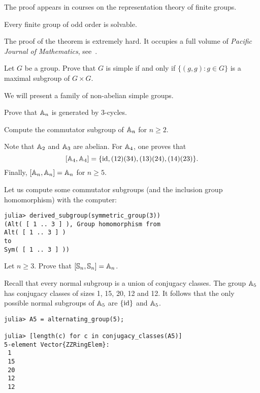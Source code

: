 The proof appears in courses on the 
representation theory of finite groups. 

\begin{theorem}
    Every finite group of odd order is solvable.
\end{theorem}

The proof of the theorem is extremely hard. It occupies a full volume of
\emph{Pacific Journal of Mathematics}, see~\cite{MR166261}.



\begin{exercise}
\label{xca:diagonal}
    Let $G$ be a group. 
    Prove that $G$ is simple if and only if 
    $\{(g,g):g\in G\}$ 
    is a maximal subgroup of $G\times G$. 
\end{exercise}


We will present a family of non-abelian simple groups. 

\begin{exercise}
    Prove that $\mathbb{A}_n$ is generated by 3-cycles. 
\end{exercise}

\begin{exercise}
    Compute the commutator subgroup of $\mathbb{A}_n$ for
    $n\geq2$. 
\end{exercise}

Note that $\mathbb{A}_2$ and $\mathbb{A}_3$ are abelian. 
For $\mathbb{A}_4$, one proves that 
\[
[\mathbb{A}_4,\mathbb{A}_4]=\{\operatorname{id},(12)(34),(13)(24),(14)(23)\}.
\]
Finally, $[\mathbb{A}_n,\mathbb{A}_n]=\mathbb{A}_n$ for $n\geq5$. 

Let us compute some commutator subgroups (and the inclusion group homomorphism)  
with the computer:
\begin{lstlisting}
julia> derived_subgroup(symmetric_group(3))
(Alt( [ 1 .. 3 ] ), Group homomorphism from 
Alt( [ 1 .. 3 ] )
to
Sym( [ 1 .. 3 ] ))    
\end{lstlisting}

\begin{exercise}
    Let $n\geq3$. 
    Prove that $[\mathbb{S}_n,\mathbb{S}_n]=\mathbb{A}_n$. 
\end{exercise}

Recall that every normal subgroup is a union of conjugacy classes. The group 
$\mathbb{A}_5$ has conjugacy classes of sizes 1, 15, 20, 12 and 12. It follows that 
the only possible normal subgroups of $\mathbb{A}_5$ are $\{\operatorname{id}\}$ and $\mathbb{A}_5$. 
\begin{lstlisting}
julia> A5 = alternating_group(5);

julia> [length(c) for c in conjugacy_classes(A5)]
5-element Vector{ZZRingElem}:
 1
 15
 20
 12
 12 
\end{lstlisting}

